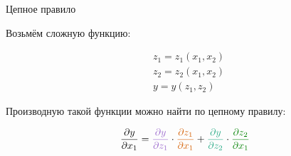 \documentclass[notes,12pt, aspectratio=169]{beamer}
\newenvironment{wideitemize}{\itemize\addtolength{\itemsep}{10pt}}{\enditemize}
\begin{document}
\begin{frame}{Цепное правило}
	\begin{wideitemize}
		\item  Возьмём сложную функцию: 
		
		\begin{equation*}
		\begin{aligned}
		& z_1 = z_1(x_1, x_2) \\  & z_2 = z_2(x_1, x_2) \\  & y = y(z_1, z_2)
		\end{aligned}
		\end{equation*} 
		
		\item Производную такой функции можно найти по цепному правилу: 
		
		$$
		\frac{\partial y}{\partial x_1} = {\color{amethyst} \frac{\partial y}{\partial z_1}} \cdot {\color{red} \frac{\partial z_1}{\partial x_1}} + {\color{junglegreen} \frac{\partial y}{\partial z_2}} \cdot {\color{green} \frac{\partial z_2}{\partial x_1}}
		$$ 
	\end{wideitemize}
\end{frame} 
\end{document}
